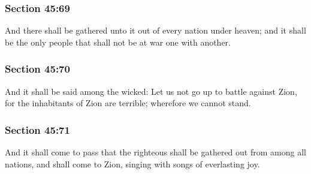 	\subsubsection{Section 45:69} %
		\label{DC45-69}

		And there shall be gathered unto it out of every nation under heaven; and it shall be the only people that shall not be at war one with another.


	\subsubsection{Section 45:70} %
		\label{DC45-70}

		And it shall be said among the wicked: Let us not go up to battle against Zion, for the inhabitants of Zion are terrible; wherefore we cannot stand.


	\subsubsection{Section 45:71} %
		\label{DC45-71}

		And it shall come to pass that the righteous shall be gathered out from among all nations, and shall come to Zion, singing with songs of everlasting joy.


